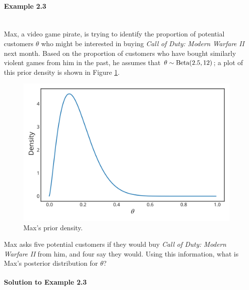 \paragraph{Example 2.3}{~\\
Max, a video game pirate, is trying to identify the proportion of potential customers $\theta$ who might be interested in buying \textit{Call of Duty: Modern Warfare II} next month. \label{ex:max} Based on the proportion of customers who have bought similarly violent games from him in the past, he assumes that $\theta \sim \textnormal{\text{Beta}}(2.5,12)$; a plot of this prior density is shown in Figure \ref{fig:maxprior}.  

\begin{figure}[h!]

\includegraphics{images/priorplot3.svg}
\caption{Max's prior density.}
\label{fig:maxprior}

\end{figure}
Max asks five potential customers if they would buy \textit{Call of Duty: Modern Warfare II} from him, and four say they would.  Using this information, what is Max's posterior distribution for $\theta$?   
\paragraph{Solution to Example 2.3}{
    
}

{
    

}}
